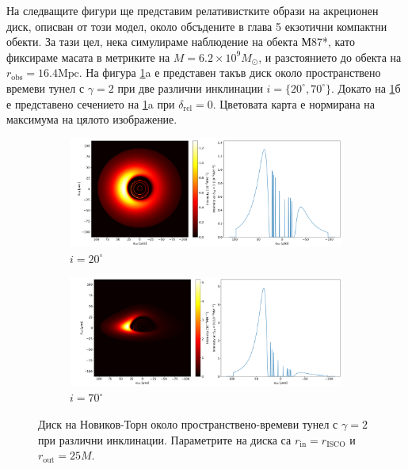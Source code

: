На следващите фигури ще представим релативистките образи на акреционен диск, описван от този модел, около обсъдените в глава 5 екзотични компактни обекти. За тази цел, нека симулираме наблюдение на обекта М87*, като фиксираме масата в метриките на $M = 6.2\times10^9 M_\odot$, и разстоянието до обекта на $r_\text{obs} = 16.4 \text{Mpc}$. На фигура \ref{WH_NT}a е представен такъв диск около пространствено времеви тунел с $\gamma = 2$ при две различни инклинации $i=\{20^\circ, 70^\circ\}$. Докато на \ref{WH_NT}б е представено сечението на \ref{WH_NT}a при $\delta_\text{rel} = 0$. Цветовата карта е нормирана на максимума на цялото изображение. \\

\begin{figure}[!htb]
	\centering
	\begin{subfigure}{12cm}
		\hspace{-0.6cm}
		\includegraphics[scale = 0.26]{WH_NT_Gamma2_20_deg.png}
		\caption{$i = 20^\circ$} 
	\end{subfigure}
	\begin{subfigure}{12cm}
		\hspace{-0.6cm}
		\includegraphics[scale = 0.26]{WH_NT_Gamma2_70_deg.png}
		\caption{$i = 70^\circ$} 
	\end{subfigure}
	\caption[Диск на Новиков-Торн около пространствено-времеви тунел при различни инклинации.]{\small Диск на Новиков-Торн около пространствено-времеви тунел с $\gamma = 2$ при различни инклинации. Параметрите на диска са $r_\text{in} = r_\text{ISCO}$ и $r_\text{out} = 25M$.} 
	\label{WH_NT}
\end{figure}


